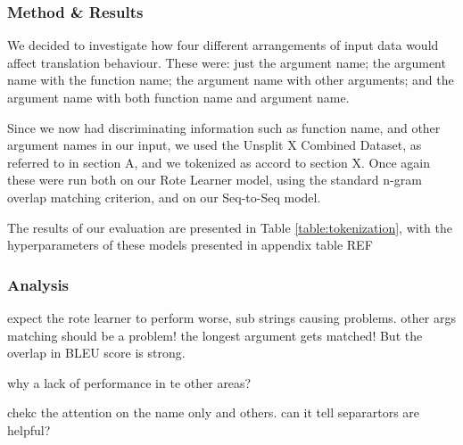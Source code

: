 \subsubsection{Method \& Results} %

We decided to investigate how four different arrangements of input data would affect translation behaviour. 
These were:
just the argument name; the argument name with the function name; the argument name with other arguments; and the argument name with both function name and argument name.

Since we now had discriminating information such as function name, and other argument names in our input, we used the Unsplit X Combined Dataset, as referred to in section A, and we tokenized as accord to section X.
Once again these were run both on our Rote Learner model, using the standard n-gram overlap matching criterion, and on our Seq-to-Seq model.

The results of our evaluation are presented in Table \ref{table:tokenization}, with the hyperparameters of these models presented in appendix table REF


\subsubsection{Analysis} %
\label{ssub:analysis}


\begin{enumerate*}

 \item expect the rote learner to perform worse, sub strings causing problems. other args matching should be a problem! the longest argument gets matched! But the overlap in BLEU score is strong.
 \item why a lack of performance in te other areas?
  \item chekc the attention on the name only and others. can it tell separartors are helpful?
\end{enumerate*}



